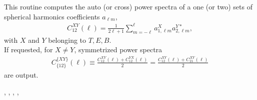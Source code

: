 
\sloppy


\section[alm2cl*]{ }
\label{sub:alm2cl}
\author{Eric Hivon}

\begin{facility}
{This routine computes the auto (or cross) power spectra of a one (or two) sets of spherical harmonics
  coefficients $a_{\ell m}$,
\begin{eqnarray}
\label{eq:alm2cla}
C_{12}^{XY}(\ell) = \frac{1}{2 \ell +1}
\sum_{m=-\ell}^{\ell} a_{1,\ell m}^X
  a_{2,\ell m}^{Y*},
\end{eqnarray}
with $X$ and $Y$ belonging to $T,E,B$. \\
If requested, for $X \ne Y$, symmetrized power spectra
\begin{eqnarray}
\label{eq:alm2clb}
  C_{\{12\}}^{\{XY\}}(\ell) \equiv \frac{C_{12}^{XY}(\ell)+C_{12}^{YX}(\ell)}{2} = \frac{C_{12}^{XY}(\ell)+C_{21}^{XY}(\ell)}{2}
\end{eqnarray}
are output.


}
{\modAlmTools}
\end{facility}

\begin{f90format}
{%
, %
, %
,  %
, %
}
\end{f90format}
\aboutoptional

